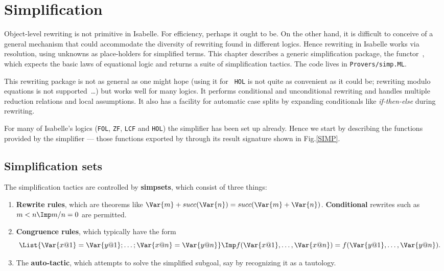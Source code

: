 \chapter{Simplification} \label{simp-chap}
Object-level rewriting is not primitive in Isabelle.  For efficiency,
perhaps it ought to be.  On the other hand, it is difficult to conceive of
a general mechanism that could accommodate the diversity of rewriting found
in different logics.  Hence rewriting in Isabelle works via resolution,
using unknowns as place-holders for simplified terms.  This chapter
describes a generic simplification package, the functor~,
which expects the basic laws of equational logic and returns a suite of
simplification tactics.  The code lives in
\verb$Provers/simp.ML$.

This rewriting package is not as general as one might hope (using it for {\tt
HOL} is not quite as convenient as it could be; rewriting modulo equations is
not supported~\ldots) but works well for many logics.  It performs
conditional and unconditional rewriting and handles multiple reduction
relations and local assumptions.  It also has a facility for automatic case
splits by expanding conditionals like {\it if-then-else\/} during rewriting.

For many of Isabelle's logics ({\tt FOL}, {\tt ZF}, {\tt LCF} and {\tt HOL})
the simplifier has been set up already. Hence we start by describing the
functions provided by the simplifier --- those functions exported by
 through its result signature  shown in
Fig.\ts\ref{SIMP}.  


\section{Simplification sets}
The simplification tactics are controlled by {\bf simpsets}, which consist of
three things:
\begin{enumerate}
\item {\bf Rewrite rules}, which are theorems like 
$\Var{m} + succ(\Var{n}) = succ(\Var{m} + \Var{n})$.  {\bf Conditional}
rewrites such as $m<n \Imp m/n = 0$ are permitted.

\item {\bf Congruence rules}, which typically have the form
\[ \List{\Var{x@1} = \Var{y@1}; \ldots; \Var{x@n} = \Var{y@n}} \Imp
   f(\Var{x@1},\ldots,\Var{x@n}) = f(\Var{y@1},\ldots,\Var{y@n}).
\]

\item The {\bf auto-tactic}, which attempts to solve the simplified
subgoal, say by recognizing it as a tautology.
\end{enumerate}

